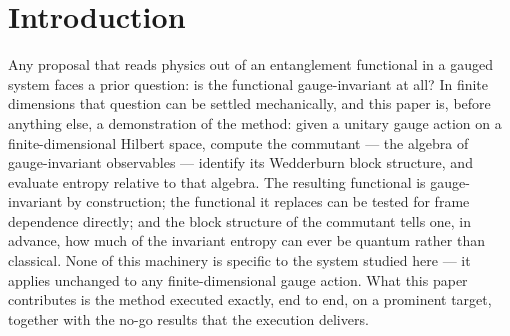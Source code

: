 \documentclass[11pt]{article}
\begin{document}
\begin{abstract}
three-coupling question can even be posed. The scope of the no-go is \emph{single-copy}, and deliberately so: it closes the entropy version of the question and the single-copy invariant-data version --- everything measurable on one copy of the state under the charge superselection rule --- and leaves the multi-copy invariant ring open as the concrete next step (Section~8). The no-go concerns \emph{determination}, not \emph{reconstruction}: it rules out an algebra-dictated map from the kinematic invariant data of a single state to three couplings, while in two-dimensional Yang--Mills --- where dynamics supplies a known one-parameter family of flux-sector distributions --- the coupling is exactly reconstructible from precisely this kind of center data \cite{ym2companion}. For any version of the question to survive, two things would have to exist: a two-ideal construction on which $SU(2)_L$ acts --- specified in Section~9, and since carried out in a drafted companion manuscript \cite{twoideal} --- and a principle linking sector statistics to couplings, which remains absent.
\end{abstract}

\section{Introduction}

Any proposal that reads physics out of an entanglement functional in a gauged system faces a prior question: is the functional gauge-invariant at all? In finite dimensions that question can be settled mechanically, and this paper is, before anything else, a demonstration of the method: given a unitary gauge action on a finite-dimensional Hilbert space, compute the commutant --- the algebra of gauge-invariant observables --- identify its Wedderburn block structure, and evaluate entropy relative to that algebra. The resulting functional is gauge-invariant by construction; the functional it replaces can be tested for frame dependence directly; and the block structure of the commutant tells one, in advance, how much of the invariant entropy can ever be quantum rather than classical. None of this machinery is specific to the system studied here --- it applies unchanged to any finite-dimensional gauge action. What this paper contributes is the method executed exactly, end to end, on a prominent target, together with the no-go results that the execution delivers.
\end{document}
